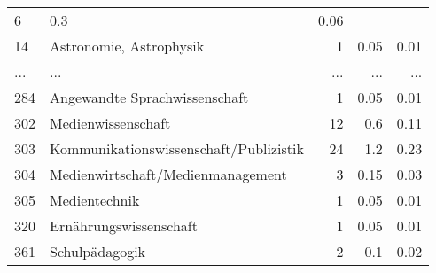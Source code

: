 \begin{longtable}{lXrrr}
          \num{6} &
          \num[round-mode=places,round-precision=2]{0.3} &
          \num[round-mode=places,round-precision=2]{0.06} \\
        14 & \multicolumn{1}{X}{Astronomie, Astrophysik} & %
          \num{1} &
          \num[round-mode=places,round-precision=2]{0.05} &
          \num[round-mode=places,round-precision=2]{0.01} \\
       ... & ... & ... & ... & ... \\
        284 & \multicolumn{1}{X}{Angewandte Sprachwissenschaft} & %
          \num{1} &
          \num[round-mode=places,round-precision=2]{0.05} &
          \num[round-mode=places,round-precision=2]{0.01} \\

        302 & \multicolumn{1}{X}{Medienwissenschaft} & %
          \num{12} &
          \num[round-mode=places,round-precision=2]{0.6} &
          \num[round-mode=places,round-precision=2]{0.11} \\

        303 & \multicolumn{1}{X}{Kommunikationswissenschaft/Publizistik} & %
          \num{24} &
          \num[round-mode=places,round-precision=2]{1.2} &
          \num[round-mode=places,round-precision=2]{0.23} \\

        304 & \multicolumn{1}{X}{Medienwirtschaft/Medienmanagement} & %
          \num{3} &
          \num[round-mode=places,round-precision=2]{0.15} &
          \num[round-mode=places,round-precision=2]{0.03} \\

        305 & \multicolumn{1}{X}{Medientechnik} & %
          \num{1} &
          \num[round-mode=places,round-precision=2]{0.05} &
          \num[round-mode=places,round-precision=2]{0.01} \\

        320 & \multicolumn{1}{X}{Ernährungswissenschaft} & %
          \num{1} &
          \num[round-mode=places,round-precision=2]{0.05} &
          \num[round-mode=places,round-precision=2]{0.01} \\

        361 & \multicolumn{1}{X}{Schulpädagogik} & %
          \num{2} &
          \num[round-mode=places,round-precision=2]{0.1} &
          \num[round-mode=places,round-precision=2]{0.02} \\


\end{longtable}
